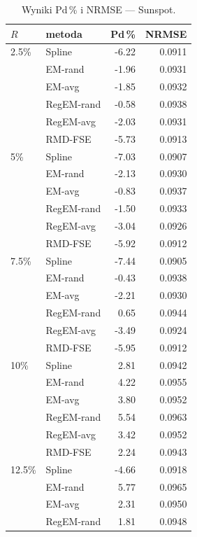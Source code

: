 \begin{table}[htbp]
  \centering
  \scriptsize
  \begin{minipage}[t]{0.48\textwidth}
    \centering
    \caption{Wyniki Pd\,\% i NRMSE --- Sunspot.}
    \label{tab:rule02-sunspot}
    \begin{tabular}{llrr}
      \hline
      $R$ & metoda & Pd\,\% & NRMSE \\
      \hline
      2.5\% & Spline & -6.22 & 0.0911  \\
     & EM-rand & -1.96 & 0.0931  \\
     & EM-avg & -1.85 & 0.0932 \\
     & RegEM-rand & -0.58 & 0.0938 \\
     & RegEM-avg & -2.03 & 0.0931 \\
     & RMD-FSE & -5.73 & 0.0913 \\
    \hline
    5\% & Spline & -7.03 & 0.0907 \\
     & EM-rand & -2.13 & 0.0930 \\
     & EM-avg & -0.83 & 0.0937 \\
     & RegEM-rand & -1.50 & 0.0933 \\
     & RegEM-avg & -3.04 & 0.0926 \\
     & RMD-FSE & -5.92 & 0.0912 \\
    \hline
    7.5\% & Spline & -7.44 & 0.0905 \\
     & EM-rand & -0.43 & 0.0938 \\
     & EM-avg & -2.21 & 0.0930 \\
     & RegEM-rand & 0.65 & 0.0944 \\
     & RegEM-avg & -3.49 & 0.0924 \\
     & RMD-FSE & -5.95 & 0.0912 \\
    \hline
    10\% & Spline & 2.81 & 0.0942 \\
     & EM-rand & 4.22 & 0.0955 \\
     & EM-avg & 3.80 & 0.0952 \\
     & RegEM-rand & 5.54 & 0.0963 \\
     & RegEM-avg & 3.42 & 0.0952 \\
     & RMD-FSE & 2.24 & 0.0943 \\
    \hline
    12.5\% & Spline & -4.66 & 0.0918 \\
     & EM-rand & 5.77 & 0.0965 \\
     & EM-avg & 2.31 & 0.0950 \\
     & RegEM-rand & 1.81 & 0.0948 \\

\end{tabular}
\end{minipage}
\end{table}
